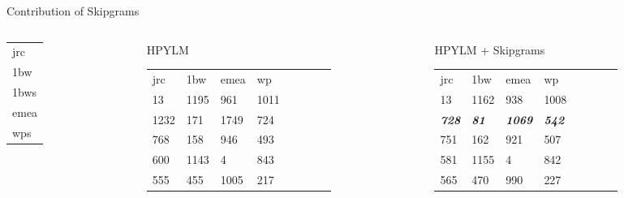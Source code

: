 \documentclass[department=cls, notes={hide notes}, official=true]{beamerruhuisstijl}
\begin{document}
\begin{frame}{Contribution of Skipgrams}

\begin{columns}[b]
		\begin{column}[b]{0.1\textwidth}
            	\begin{block}{\strut}
                \begin{tabular}{l}
                      \\
					jrc \\
                    1bw\\
                    1bws\\
                    emea\\
                    wps \\
                    \end{tabular}
                \end{block}
                \vspace{0pt}
    		\end{column}
			\begin{column}[b]{0.4\textwidth}
            	\begin{block}{HPYLM}
                \begin{tabular}{llllllll}
                     jrc  & 1bw   & emea & wp   \\
					 13 & 1195 & 961 & 1011 \\
                     1232 & 171 & 1749 & 724 \\
                     768 & 158 & 946 & 493 \\
                     600 & 1143 & 4 & 843 \\ 
                    555 & 455 & 1005 & 217 \\
                    \end{tabular}
                \end{block}
                \vspace{0pt}
    		\end{column}
            \quad
        	\begin{column}[b]{0.4\textwidth}
            	\begin{block}{HPYLM + Skipgrams}
				\begin{tabular}{llllllll}
                         jrc  & 1bw   & emea & wp   \\
                     13 & 1162 & 938 & 1008 \\
                      \textbf{\textit{728}} & \textbf{\textit{81}} & \textbf{\textit{1069}} & \textbf{\textit{542}} \\
                     751 & 162 & 921 & 507 \\
                     581 & 1155 & 4 & 842 \\
                     565 & 470 & 990 & 227 \\
                \end{tabular}
                \end{block}
                \vspace{0pt}
    		\end{column}       
        \end{columns}
 
\end{frame}
\end{document}
